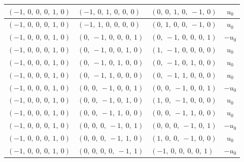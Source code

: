 \documentclass[11pt]{article}
\theoremstyle{definition}
\begin{document}
\begin{longtable}{|l|l|l|c|}
    \hline
    $\left( -1, \  0, \  0, \  0, \  1, \  0\right)$ & $\left( -1, \  0, \  1, \  0, \  0, \  0\right)$ & $\left( 0, \  0, \  1, \  0, \  -1, \  0\right)$ & $u_{0}$ \\
    \hline
    $\left( -1, \  0, \  0, \  0, \  1, \  0\right)$ & $\left( -1, \  1, \  0, \  0, \  0, \  0\right)$ & $\left( 0, \  1, \  0, \  0, \  -1, \  0\right)$ & $u_{0}$ \\
    \hline
    $\left( -1, \  0, \  0, \  0, \  1, \  0\right)$ & $\left( 0, \  -1, \  0, \  0, \  0, \  1\right)$ & $\left( 0, \  -1, \  0, \  0, \  0, \  1\right)$ & $- u_{0}$ \\
    \hline
    $\left( -1, \  0, \  0, \  0, \  1, \  0\right)$ & $\left( 0, \  -1, \  0, \  0, \  1, \  0\right)$ & $\left( 1, \  -1, \  0, \  0, \  0, \  0\right)$ & $u_{0}$ \\
    \hline
    $\left( -1, \  0, \  0, \  0, \  1, \  0\right)$ & $\left( 0, \  -1, \  0, \  1, \  0, \  0\right)$ & $\left( 0, \  -1, \  0, \  1, \  0, \  0\right)$ & $u_{0}$ \\
    \hline
    $\left( -1, \  0, \  0, \  0, \  1, \  0\right)$ & $\left( 0, \  -1, \  1, \  0, \  0, \  0\right)$ & $\left( 0, \  -1, \  1, \  0, \  0, \  0\right)$ & $u_{0}$ \\
    \hline
    $\left( -1, \  0, \  0, \  0, \  1, \  0\right)$ & $\left( 0, \  0, \  -1, \  0, \  0, \  1\right)$ & $\left( 0, \  0, \  -1, \  0, \  0, \  1\right)$ & $- u_{0}$ \\
    \hline
    $\left( -1, \  0, \  0, \  0, \  1, \  0\right)$ & $\left( 0, \  0, \  -1, \  0, \  1, \  0\right)$ & $\left( 1, \  0, \  -1, \  0, \  0, \  0\right)$ & $u_{0}$ \\
    \hline
    $\left( -1, \  0, \  0, \  0, \  1, \  0\right)$ & $\left( 0, \  0, \  -1, \  1, \  0, \  0\right)$ & $\left( 0, \  0, \  -1, \  1, \  0, \  0\right)$ & $u_{0}$ \\
    \hline
    $\left( -1, \  0, \  0, \  0, \  1, \  0\right)$ & $\left( 0, \  0, \  0, \  -1, \  0, \  1\right)$ & $\left( 0, \  0, \  0, \  -1, \  0, \  1\right)$ & $- u_{0}$ \\
    \hline
    $\left( -1, \  0, \  0, \  0, \  1, \  0\right)$ & $\left( 0, \  0, \  0, \  -1, \  1, \  0\right)$ & $\left( 1, \  0, \  0, \  -1, \  0, \  0\right)$ & $u_{0}$ \\
    \hline
    $\left( -1, \  0, \  0, \  0, \  1, \  0\right)$ & $\left( 0, \  0, \  0, \  0, \  -1, \  1\right)$ & $\left( -1, \  0, \  0, \  0, \  0, \  1\right)$ & $- u_{0}$ \\

\end{longtable}
\end{document}
